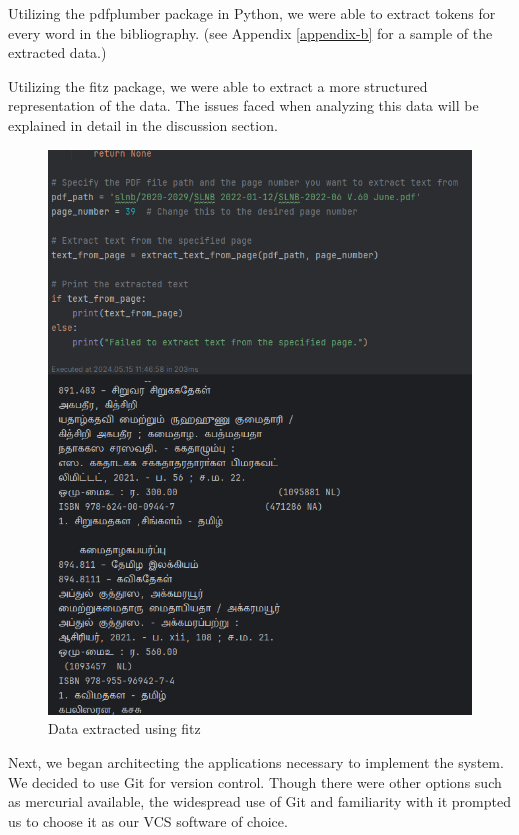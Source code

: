 Utilizing the pdfplumber package in Python, we were able to extract tokens for every word in the bibliography. (see Appendix \ref{appendix-b} for a sample of the extracted data.)

Utilizing the fitz package, we were able to extract a more structured representation of the data. The issues faced when analyzing this data will be explained in detail in the discussion section.

\begin{figure}[htbp]
    \centering
    \includegraphics[width=1\textwidth]{../../assets/extracted.png}
    \caption{Data extracted using fitz}
    \label{fig:extracted}
\end{figure}

\newpage

Next, we began architecting the applications necessary to implement the system. We decided to use Git for version control. Though there were other options such as mercurial available, the widespread use of Git and familiarity with it prompted us to choose it as our VCS software of choice.